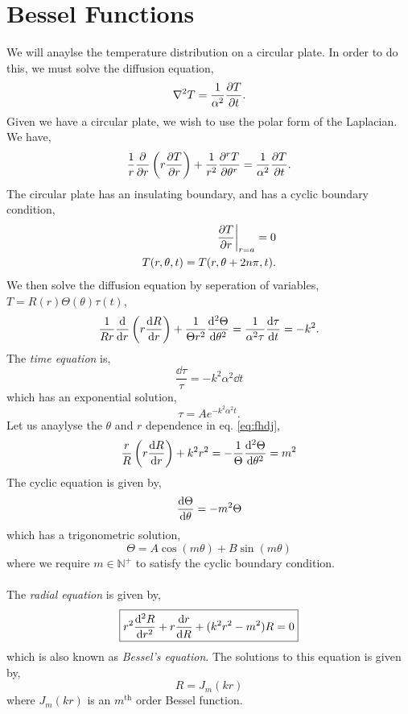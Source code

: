 \documentclass{book}
\begin{document}
\section{Bessel Functions}
We will anaylse the temperature distribution on a circular plate. In order to do this, we must solve the diffusion equation,
\begin{equation}
	\laplacian{T} = \frac{1}{\alpha^2}\pdv{T}{t}.
\end{equation}
Given we have a circular plate, we wish to use the polar form of the Laplacian. We have,
\begin{equation}
	\frac{1}{r}\pdv{r}\left(r\pdv{T}{r}\right) + \frac{1}{r^2} \pdv[r]{T}{\theta} = \frac{1}{\alpha^2}\pdv{T}{t}.
\end{equation}
The circular plate has an insulating boundary, and has a cyclic boundary condition,
\begin{align}
	\eval{\pdv{T}{r}}_{r=a} = 0 \\
	T(r,\theta,t) = T(r, \theta + 2n\pi, t).
\end{align}
We then solve the diffusion equation by seperation of variables, $T = R(r)\Theta(\theta)\tau(t)$,
\begin{equation}
	\frac{1}{Rr}\dv{r}\left(r\dv{R}{r}\right) + \frac{1}{\Theta r^2}\dv[2]{\Theta}{\theta} = \frac{1}{\alpha^2\tau}\dv{\tau}{t} = -k^2. \label{eq:fhdj}
\end{equation}
The \textit{time equation} is,
\begin{equation}
	\frac{\dd{\tau}}{\tau} = -k^2\alpha^2\dd{t}
\end{equation}
which has an exponential solution,
\begin{equation}
	\tau = Ae^{-k^2\alpha^2t}.
\end{equation}
Let us anaylyse the $\theta$ and $r$ dependence in eq. \eqref{eq:fhdj},
\begin{equation}
	\frac{r}{R}\left(r\dv{R}{r}\right) + k^2r^2 = - \frac{1}{\Theta}\dv[2]{\Theta}{\theta} = m^2
\end{equation} 
The cyclic equation is given by, 
\begin{equation}
	\dv{\Theta}{\theta} = -m^2\Theta
\end{equation}
which has a trigonometric solution,
\begin{equation}
	\Theta = A\cos(m\theta) + B\sin(m\theta)
\end{equation}
where we require $m \in \mathbb{N}^+$ to satisfy the cyclic boundary condition.
\\\\
The \textit{radial equation} is given by,
\begin{equation}
	\boxed{r^2\dv[2]{R}{r} + r\dv{r}{R} + (k^2r^2 - m^2)R = 0}
\end{equation}
which is also known as \textit{Bessel's equation}. The solutions to this equation is given by,
\begin{equation}
	R = J_m(kr)
\end{equation}
where $J_m(kr)$ is an $m^{\text{th}}$ order Bessel function.
\end{document}
